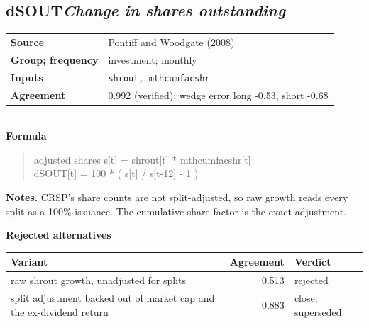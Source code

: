 \documentclass[11pt]{article}
\begin{document}
\subsection*{dSOUT\quad\normalfont\itshape Change in shares outstanding}
\begin{tabular}{@{}p{3.3cm}p{12.3cm}@{}}
\textbf{Source} & Pontiff and Woodgate (2008)\\
\textbf{Group; frequency} & investment; monthly\\
\textbf{Inputs} & \texttt{shrout, mthcumfacshr}\\
\textbf{Agreement} & 0.992 (verified); wedge error long -0.53, short -0.68\\
\end{tabular}\\[4pt]
\textbf{Formula}
\begin{quote}\small
adjusted shares s[t] = shrout[t] * mthcumfacshr[t]\\
dSOUT[t] = 100 * ( s[t] / s[t-12] - 1 )\\

\end{quote}
\textbf{Notes.} CRSP's share counts are not split-adjusted, so raw growth reads every split as a 100\% issuance. The cumulative share factor is the exact adjustment.


\textbf{Rejected alternatives}\\[2pt]
{\small\begin{longtable}{@{}p{9.6cm}rp{4.3cm}@{}}
\toprule Variant & Agreement & Verdict\\\midrule\endhead
raw shrout growth, unadjusted for splits & 0.513 & rejected\\
split adjustment backed out of market cap and the ex-dividend return & 0.883 & close, superseded\\
\bottomrule\end{longtable}}
\end{document}
